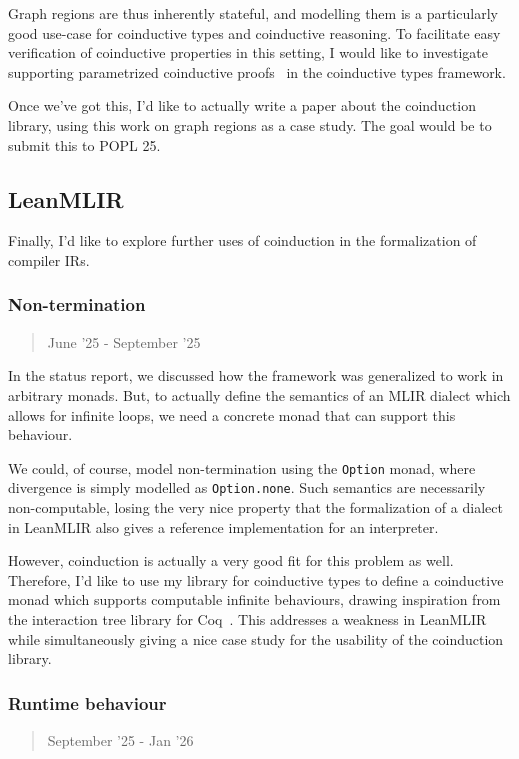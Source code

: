 \documentclass[a4paper]{scrartcl}
\begin{document}
Graph regions are thus inherently stateful, and modelling them is a
particularly good use-case for coinductive types and coinductive
reasoning. To facilitate easy verification of coinductive properties in
this setting, I would like to investigate supporting parametrized
coinductive proofs~\cite{hurPowerParameterizationCoinductive} in
the coinductive types framework.

Once we've got this, I'd like to actually write a paper about the coinduction library, using this work on graph regions as a case study.
The goal would be to submit this to POPL 25.


\subsection{LeanMLIR}\label{leanmlir}

Finally, I'd like to explore further uses of coinduction in the formalization of compiler IRs.

\subsubsection{Non-termination}\label{non-termination}

\begin{quote}
June '25 - September  '25
\end{quote}

In the status report, we discussed how the framework was generalized to
work in arbitrary monads. But, to actually define the semantics of an
MLIR dialect which allows for infinite loops, we need a concrete monad
that can support this behaviour.

We could, of course, model non-termination using the \texttt{Option}
monad, where divergence is simply modelled as \texttt{Option.none}. Such
semantics are necessarily non-computable, losing the very nice property
that the formalization of a dialect in LeanMLIR also gives a reference
implementation for an interpreter.

However, coinduction is actually a very good fit for this problem as well.
Therefore, I'd like to use my library for coinductive types to define a
coinductive monad which supports computable infinite behaviours, drawing
inspiration from the interaction tree library for Coq~\cite{xiaInteractionTreesRepresenting2020}.
This addresses a
weakness in LeanMLIR while simultaneously giving a nice case study for
the usability of the coinduction library.

\subsubsection{Runtime behaviour}\label{runtime-behaviour}
\begin{quote}
September '25 - Jan '26
\end{quote}
\end{document}

